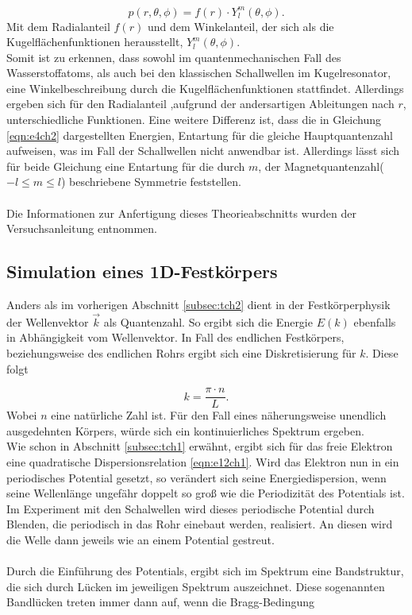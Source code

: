 \begin{equation}
  \label{eqn:e6ch2}
  p(r, \theta, \phi) = f(r) \cdot Y_{l}^{m}(\theta, \phi).
\end{equation}
Mit dem Radialanteil $f(r)$ und dem Winkelanteil, der sich als die Kugelflächenfunktionen
herausstellt, $Y_{l}^{m}(\theta, \phi)$.\\

Somit ist zu erkennen, dass sowohl im quantenmechanischen Fall des Wasserstoffatoms, als auch bei
den klassischen Schallwellen im Kugelresonator, eine Winkelbeschreibung durch die Kugelflächenfunktionen stattfindet.
Allerdings ergeben sich für den Radialanteil ,aufgrund der andersartigen Ableitungen nach $r$, unterschiedliche
Funktionen. Eine weitere Differenz ist, dass die in Gleichung \eqref{eqn:e4ch2} dargestellten Energien,
Entartung für die gleiche Hauptquantenzahl aufweisen, was im Fall der Schallwellen nicht anwendbar ist.
Allerdings lässt sich für beide Gleichung eine Entartung für die durch $m$, der Magnetquantenzahl($-l \leq m \leq l$)
beschriebene Symmetrie feststellen.\\ \\
Die Informationen zur Anfertigung dieses Theorieabschnitts wurden der Versuchsanleitung \cite{sample2}
entnommen.


\subsection{Simulation eines 1D-Festkörpers}
\label{subsec:tch4}
Anders als im vorherigen Abschnitt \ref{subsec:tch2} dient in der Festkörperphysik der Wellenvektor
$\vec k$ als Quantenzahl. So ergibt sich die Energie $E(k)$ ebenfalls in Abhängigkeit vom Wellenvektor.
In Fall des endlichen Festkörpers, beziehungsweise des endlichen Rohrs ergibt sich eine Diskretisierung
für $k$. Diese folgt

\begin{equation}
  \label{eqn:e1ch4}
  k = \frac{\pi \cdot n}{L}.
\end{equation}
Wobei $n$ eine natürliche Zahl ist. Für den Fall eines näherungsweise unendlich ausgedehnten Körpers,
würde sich ein kontinuierliches Spektrum ergeben.\\
Wie schon in Abschnitt \ref{subsec:tch1} erwähnt, ergibt sich für das freie Elektron eine quadratische
Dispersionsrelation \eqref{eqn:e12ch1}. Wird das Elektron nun in ein periodisches Potential gesetzt,
so verändert sich seine Energiedispersion, wenn seine Wellenlänge ungefähr doppelt so groß wie die
Periodizität des Potentials ist.\\
Im Experiment mit den Schalwellen wird dieses periodische Potential durch Blenden, die periodisch in
das Rohr einebaut werden, realisiert. An diesen wird die Welle dann jeweils wie an einem Potential gestreut.\\ \\
Durch die Einführung des Potentials, ergibt sich im Spektrum eine Bandstruktur, die sich durch Lücken im jeweiligen
Spektrum auszeichnet.
Diese sogenannten Bandlücken treten immer dann auf, wenn die Bragg-Bedingung

